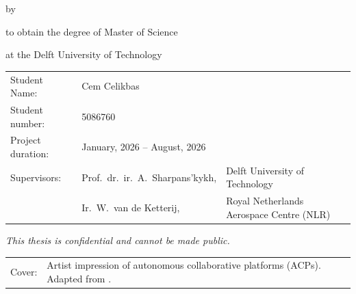 \begin{titlepage}

\begin{center}

{\makeatletter
\largetitlestyle\fontsize{45}{45}\selectfont\@title
\makeatother}

{\makeatletter
\ifdefvoid{\@subtitle}{}{\bigskip\titlestyle\fontsize{20}{20}\selectfont\@subtitle}
\makeatother}

\bigskip
\bigskip

by

\bigskip
\bigskip

{\makeatletter
\largetitlestyle\fontsize{25}{25}\selectfont\@author
\makeatother}

\bigskip
\bigskip

to obtain the degree of Master of Science

at the Delft University of Technology


\vfill

\begin{tabular}{lll}
    Student Name: & Cem Celikbas \\
    Student number: & 5086760 \\
    Project duration: & \multicolumn{2}{l}{January, 2026 -- August, 2026} \\
    Supervisors: & Prof.\ dr.\ ir.\ A.\ Sharpans'kykh, & Delft University of Technology \\
        & Ir.\ W.\ van de Ketterij, & Royal Netherlands Aerospace Centre (NLR)
\end{tabular}

\bigskip
\bigskip
\emph{This thesis is confidential and cannot be made public.}

\bigskip
\bigskip
\begin{tabular}{p{15mm}p{10cm}}
    Cover: & Artist impression of autonomous collaborative platforms (ACPs). Adapted from \cite{USAF_CCA_2025}. \\
\end{tabular}


\end{center}
\end{titlepage}

